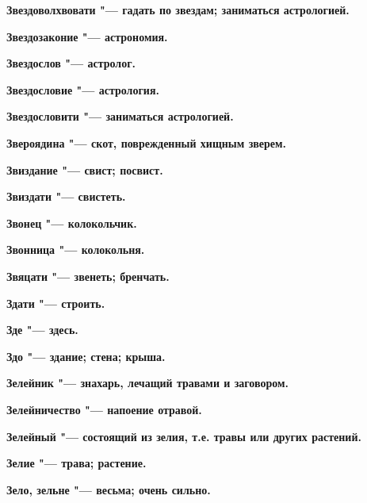\bfseries Звездоволхвовати \normalfont{} "--- гадать по звездам; заниматься астрологией. 




\bfseries Звездозаконие \normalfont{} "--- астрономия. 




\bfseries Звездослов \normalfont{} "--- астролог. 




\bfseries Звездословие \normalfont{} "--- астрология. 




\bfseries Звездословити \normalfont{} "--- заниматься астрологией. 




\bfseries Звероядина \normalfont{} "--- скот, поврежденный хищным зверем. 




\bfseries Звиздание \normalfont{} "--- свист; посвист. 




\bfseries Звиздати \normalfont{} "--- свистеть. 




\bfseries Звонец \normalfont{} "--- колокольчик. 




\bfseries Звонница \normalfont{} "--- колокольня. 




\bfseries Звяцати \normalfont{} "--- звенеть; бренчать. 




\bfseries Здати \normalfont{} "--- строить. 




\bfseries Зде \normalfont{} "--- здесь. 




\bfseries Здо \normalfont{} "--- здание; стена; крыша. 




\bfseries Зелейник \normalfont{} "--- знахарь, лечащий травами и заговором. 




\bfseries Зелейничество \normalfont{} "--- напоение отравой. 




\bfseries Зелейный \normalfont{} "--- состоящий из зелия, т.е. травы или других растений. 




\bfseries Зелие \normalfont{} "--- трава; растение. 




\bfseries Зело, зельне \normalfont{} "--- весьма; очень сильно. 




